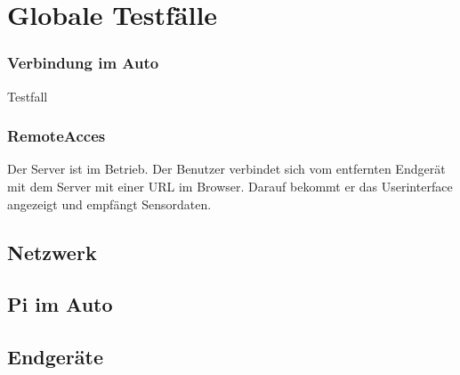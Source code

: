 \documentclass[pflichtenheft.tex]{subfiles}
\begin{document}
\chapter{Globale Testfälle}

\subsection{\mkt Verbindung im Auto} Testfall

\subsection{\mkt RemoteAcces} Der Server ist im Betrieb. Der Benutzer verbindet sich vom entfernten Endgerät mit dem Server mit einer URL im Browser. Darauf bekommt er das Userinterface angezeigt und empfängt Sensordaten.

\section{Netzwerk}
\section{Pi im Auto}
\section{Endgeräte}
\end{document}
